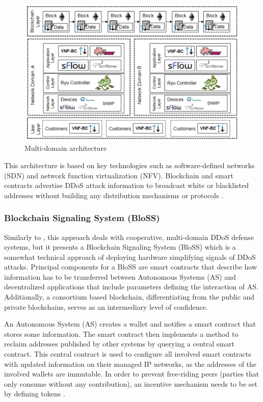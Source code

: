 \begin{figure}[ht]
  \begin{center}
    \includegraphics[scale=0.5]{Talk7/img/ddos/multi_domain}
  \end{center}
  \caption{Multi-domain architecture}
  \label{ddos_multi_domain_architecture}
\end{figure}

This architecture is based on key technologies such as software-defined networks (SDN) and network function virtualization (NFV). Blockchain and smart contracts advertise DDoS attack information to broadcast white or blacklisted addresses without building any distribution mechanisms or protocols \cite{Rodrigues2017}.

\subsubsection{Blockchain Signaling System (BloSS)}

Similarly to \cite{Rodrigues2017}, this approach deals with cooperative, multi-domain DDoS defense systems, but it presents a Blockchain Signaling System (BloSS) which is a somewhat technical approach of deploying hardware simplifying signals of DDoS attacks. Principal components for a BloSS are smart contracts that describe how information has to be transferred between Autonomous Systems (AS) and decentralized applications that include parameters defining the interaction of AS. Additionally, a consortium based blockchain, differentiating from the public and private blockchains, serves as an intermediary level of confidence.

An Autonomous System (AS) creates a wallet and notifies a smart contract that stores some information. The smart contract then implements a method to reclaim addresses published by other systems by querying a central smart contract. This central contract is used to configure all involved smart contracts with updated information on their managed IP networks, as the addresses of the involved wallets are immutable. In order to prevent free-riding peers (parties that only consume without any contribution), an incentive mechanism needs to be set by defining tokens \cite{Rodrigues2019}.  %

